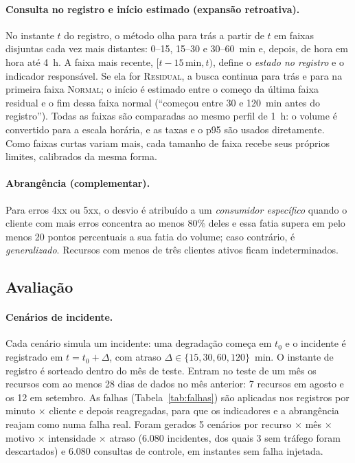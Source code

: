 \documentclass[sigconf,nonacm]{acmart}
\newcommand{\Normal}{\textsc{Normal}\xspace}
\newcommand{\Residual}{\textsc{Residual}\xspace}
\begin{document}
\paragraph{Consulta no registro e início estimado (expansão retroativa).} No instante $t$ do registro, o método olha para trás a partir de $t$ em faixas disjuntas cada vez mais distantes: 0--15, 15--30 e 30--60~min e, depois, de hora em hora até 4~h. A faixa mais recente, $[t-15\,\text{min}, t)$, define o \emph{estado no registro} e o indicador responsável. Se ela for \Residual, a busca continua para trás e para na primeira faixa \Normal; o início é estimado entre o começo da última faixa residual e o fim dessa faixa normal (``começou entre 30 e 120~min antes do registro''). Todas as faixas são comparadas ao mesmo perfil de 1~h: o volume é convertido para a escala horária, e as taxas e o p95 são usados diretamente. Como faixas curtas variam mais, cada tamanho de faixa recebe seus próprios limites, calibrados da mesma forma.

\paragraph{Abrangência (complementar).} Para erros 4xx ou 5xx, o desvio é atribuído a um \emph{consumidor específico} quando o cliente com mais erros concentra ao menos 80\% deles e essa fatia supera em pelo menos 20 pontos percentuais a sua fatia do volume; caso contrário, é \emph{generalizado}. Recursos com menos de três clientes ativos ficam indeterminados.

\subsection{Avaliação}

\paragraph{Cenários de incidente.} Cada cenário simula um incidente: uma degradação começa em $t_0$ e o incidente é registrado em $t=t_0+\Delta$, com atraso $\Delta\in\{15,30,60,120\}$~min. O instante de registro é sorteado dentro do mês de teste. Entram no teste de um mês os recursos com ao menos 28 dias de dados no mês anterior: 7 recursos em agosto e os 12 em setembro. As falhas (Tabela~\ref{tab:falhas}) são aplicadas nos registros por minuto $\times$ cliente e depois reagregadas, para que os indicadores e a abrangência reajam como numa falha real. Foram gerados 5 cenários por recurso $\times$ mês $\times$ motivo $\times$ intensidade $\times$ atraso (6.080 incidentes, dos quais 3 sem tráfego foram descartados) e 6.080 consultas de controle, em instantes sem falha injetada.
\end{document}
